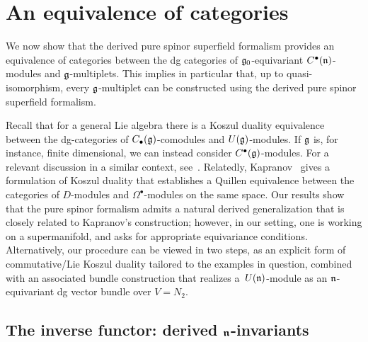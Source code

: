 \documentclass[pdftex]{sigma}
\numberwithin{equation}{section}
\def\bu{\bullet}
\begin{document}
\section{An equivalence of categories} \label{sec: equiv}
We now show that the derived pure spinor superfield formalism provides an equivalence of categories between the dg categories of $\mathfrak g_0$-equivariant $C^\bullet(\mathfrak n)$-modules and $\mathfrak g$-multiplets. This implies in particular that, up to quasi-isomorphism, every $\mathfrak g$-multiplet can be constructed using the derived pure spinor superfield formalism.

\begin{rmk}
	Recall that for a general Lie algebra there is a Koszul duality equivalence between the dg-categories of $C_\bullet(\mathfrak g)$-comodules and $U(\mathfrak g)$-modules. If $\mathfrak g$ is, for instance, finite dimensional, we can instead consider $C^\bullet(\mathfrak g)$-modules. For a relevant discussion in a similar context, see~\mbox{\cite[Sections~7 and~8]{CostelloYangian}}. Relatedly, Kapranov~\cite{Kapranov} gives a formulation of Koszul duality that establishes a Quillen equivalence between the categories of $D$-modules and $\Omega^\bu$-modules on the same space. Our results show that the pure spinor formalism admits a natural derived generalization that is closely related to Kapranov's construction; however, in our setting, one is working on a supermanifold, and asks for appropriate equivariance conditions. Alternatively, our procedure can be viewed in two steps, as an explicit form of commutative/Lie Koszul duality tailored to the examples in question, combined with an associated bundle construction that realizes a~$U(\mathfrak n)$-module as an $\mathfrak n$-equivariant dg vector bundle over $V = N_2$.
\end{rmk}

\subsection[The inverse functor: derived n-invariants]{The inverse functor: derived $\boldsymbol{\mathfrak n}$-invariants}
\end{document}
